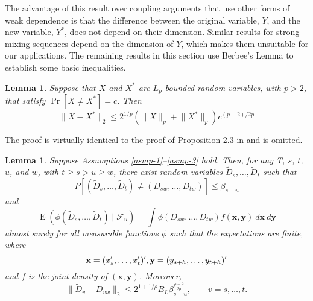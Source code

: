 \documentclass[11pt]{article}
\newtheorem{lem}[thm]{Lemma}
\DeclareMathOperator{\E}{E}
\newcommand{\h}{h}
\newcommand{\rhoExp}{\ensuremath{\frac{\rho-2}{2\rho}}}
\begin{document}
The advantage of this result over coupling arguments that use other
forms of weak dependence is that the difference between the original
variable, $Y$, and the new variable, $Y^{*}$, does not depend on their
dimension.  Similar results for strong mixing sequences depend on the
dimension of $Y$, which makes them unsuitable for our applications.
The remaining results in this section use Berbee's Lemma to establish
some basic inequalities.

\begin{lem}\label{lem-extend-mp}
  Suppose that $X$ and $X^*$ are $L_p$-bounded random variables, with
  $p > 2$, that satisfy ${\Pr[X \neq X^*] = c}$.  Then
  \[
    \lVert X - X^* \rVert_2 \leq 2^{1/p} (\lVert X \rVert_p + \lVert
    X^* \rVert_p) c^{(p-2)/2p}
  \]
\end{lem}

The proof is virtually identical to the proof of Proposition 2.3 in
\citet{MeP:02} and is omitted.

\begin{lem}\label{lem-basic-coupling}
  Suppose Assumptions \ref{asmp-1}--\ref{asmp-3} hold.  Then, for any
  T, $s$, $t$, $u$, and $w$, with $t \geq s > u \geq w$, there exist random
  variables $\tilde D_s,\dots,\tilde D_t$ such that
  \begin{equation}\label{eq:coupling1}
    P[(\tilde D_s,\dots,\tilde D_t) \neq (D_{sw},\dots,D_{tw})] \leq \beta_{s-u}
  \end{equation}
  and
  \begin{equation}\label{eq:coupling2}
    \E(\phi(\tilde D_s,\dots, \tilde D_t) \mid \mathcal{F}_u ) = 
    \int
    \phi(D_{sw},\dots,D_{tw}) f(\mathbf{x}, \mathbf{y})\ d\mathbf{x}\ d\mathbf{y}
  \end{equation}
  almost surely for all measurable functions $\phi$ such that the
  expectations are finite, where 
  \[ \mathbf{x} = (x_{s}', \dots, x_{t}')', \\
  \mathbf{y} = (y_{s+\h},\dots,y_{t+\h})'\] and $f$ is the
  joint density of $(\mathbf{x}, \mathbf{y})$.  Moreover,
 \begin{equation}\label{eq:coupling3}
   \| \tilde D_v - D_{vw} \|_2 \leq 2^{1+1/\rho} B_L
   \beta_{s-u}^\rhoExp, \qquad v = s,\dots,t.
 \end{equation}
\end{lem}
\end{document}
